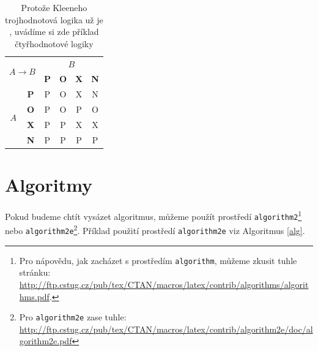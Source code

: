 \documentclass[a4paper, 11pt]{article}
\begin{document}
\begin{table}[ht]
\begin{center}
\begin{multicols}{4}
            \begin{tabular}{|c|c|c|c|c|c|}
                \hline
                \multicolumn{2}{|c|}{\multirow{2}{*}{$A \rightarrow B$}} & \multicolumn{4}{c|}{$B$} \\ \cline{3-6}
                \multicolumn{2}{|c|}{} & \textbf{P} & \textbf{O} & \textbf{X} & \textbf{N} \\ \hline
                \multirow{4}{*}{$A$} & \textbf{P} & P & O & X & N  \\ \cline{2-6}
                & \textbf{O} & P & O & P & O \\ \cline{2-6}
                & \textbf{X} & P & P & X & X \\ \cline{2-6}
                & \textbf{N} & P & P & P & P \\ 
                \hline
            \end{tabular}
            
        \end{multicols}
        \caption{Protože Kleeneho trojhodnotová logika už je , uvádíme si zde příklad čtyřhodnotové logiky} \label{tab2}
    \end{center}
\end{table}

\medskip
\pagebreak

\section{Algoritmy} \label{sec3}

Pokud budeme chtít vysázet algoritmus, můžeme použít prostředí 
\verb|algorithm2|\footnote[2]{Pro nápovědu, jak zacházet s prostředím \texttt{algorithm}, 
můžeme zkusit tuhle stránku:\\ \href{http://ftp.cstug.cz/pub/tex/CTAN/macros/latex/contrib/algorithms/algorithms.pdf}{http://ftp.cstug.cz/pub/tex/CTAN/macros/latex/contrib/algorithms/algorithms.pdf}.} 
nebo \verb|algorithm2e|\footnote[3]{Pro \texttt{algorithm2e} zase tuhle: 
\href{http://ftp.cstug.cz/pub/tex/CTAN/macros/latex/contrib/algorithm2e/doc/algorithm2e.pdf}{http://ftp.cstug.cz/pub/tex/CTAN/macros/latex/contrib/algorithm2e/doc/algorithm2e.pdf}}.
Příklad použití prostředí \verb|algorithm2e| viz Algoritmus \ref{alg}.
\end{document}
